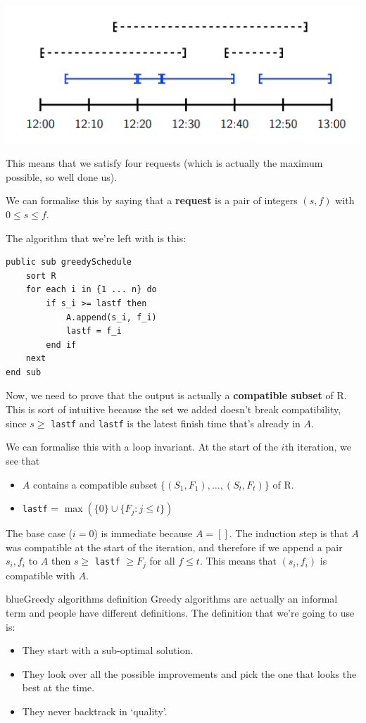 \documentclass[11pt,a4paper,titlepage,dvipsnames,cmyk]{scrartcl}
\begin{document}
\begin{center}
    \includegraphics[scale=.5]{graph-assigned}
\end{center}

This means that we satisfy four requests (which is actually the maximum
possible, so well done us).

We can formalise this by saying that a \textbf{request} is a pair of
integers $(s,f)$ with $0 \le s \le f$.

\newpage
The algorithm that we're left with is this:
\begin{lstlisting}
public sub greedySchedule
    sort R
    for each i in {1 ... n} do
        if s_i >= lastf then
            A.append(s_i, f_i)
            lastf = f_i
        end if
    next
end sub
\end{lstlisting}

Now, we need to prove that the output is actually a \textbf{compatible
subset} of R. This is sort of intuitive because the set we added doesn't
break compatibility, since $s \ge$ \lstinline|lastf| and \lstinline|lastf|
is the latest finish time that's already in $A$.

We can formalise this with a loop invariant. At the start of the $i$th
iteration, we see that
\begin{itemize}
    \item $A$ contains a compatible subset $\{(S_1,F_1), \dots,
        (S_t,F_t)\}$ of R.
    \item \lstinline|lastf| = $\max(\{0\} \cup \{F_j : j \le t\})$ 
\end{itemize}

The base case ($i=0$) is immediate because $A = []$. The induction step is
that $A$ was compatible at the start of the iteration, and therefore if we
append a pair $s_i,f_i$ to $A$ then $s \ge $ \lstinline|lastf| $\ge F_j$
for all $f \le t$. This means that $(s_i,f_i)$ is compatible with $A$.


\begin{titlebox}{blue}{Greedy algorithms definition}
Greedy algorithms are actually an informal term and people have different
definitions. The definition that we're going to use is:
\begin{itemize}
    \item They start with a sub-optimal solution.
    \item They look over all the possible improvements and pick the one
        that looks the best at the time.
    \item They never backtrack in `quality'.
\end{itemize}
\end{titlebox}
\end{document}
